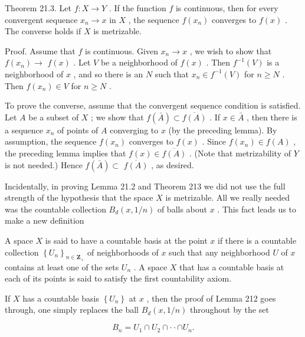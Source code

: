 Theorem 21.3. Let \(f : X \rightarrow  Y\) . If the function \(f\) is continuous, then for every convergent sequence \({x}_{n} \rightarrow  x\) in \(X\) , the sequence \(f\left( {x}_{n}\right)\) converges to \(f\left( x\right)\) . The converse holds if \(X\) is metrizable.

Proof. Assume that \(f\) is continuous. Given \({x}_{n} \rightarrow  x\) , we wish to show that \(f\left( {x}_{n}\right)  \rightarrow\)  \(f\left( x\right)\) . Let \(V\) be a neighborhood of \(f\left( x\right)\) . Then \({f}^{-1}\left( V\right)\) is a neighborhood of \(x\) , and so there is an \(N\) such that \({x}_{n} \in  {f}^{-1}\left( V\right)\) for \(n \geq  N\) . Then \(f\left( {x}_{n}\right)  \in  V\) for \(n \geq  N\) .

To prove the converse, assume that the convergent sequence condition is satisfied. Let \(A\) be a subset of \(X\) ; we show that \(f\left( \bar{A}\right)  \subset  \overline{f\left( A\right) }\) . If \(x \in  \bar{A}\) , then there is a sequence \({x}_{n}\) of points of \(A\) converging to \(x\) (by the preceding lemma). By assumption, the sequence \(f\left( {x}_{n}\right)\) converges to \(f\left( x\right)\) . Since \(f\left( {x}_{n}\right)  \in  f\left( A\right)\) , the preceding lemma implies that \(f\left( x\right)  \in  \overline{f\left( A\right) }\) . (Note that metrizability of \(Y\) is not needed.) Hence \(f\left( \bar{A}\right)  \subset\)  \(\overline{f\left( A\right) }\) , as desired.

Incidentally, in proving Lemma 21.2 and Theorem 213 we did not use the full strength of the hypothesis that the space \(X\) is metrizable. All we really needed was the countable collection \({B}_{d}\left( {x,1/n}\right)\) of balls about \(x\) . This fact leads us to make a new definition

A space \(X\) is said to have a countable basis at the point \(x\) if there is a countable collection \({\left\{  {U}_{n}\right\}  }_{n \in  {\mathbf{Z}}_{ + }}\) of neighborhoods of \(x\) such that any neighborhood \(U\) of \(x\) contains at least one of the sets \({U}_{n}\) . A space \(X\) that has a countable basis at each of its points is said to satisfy the first countability axiom.

If \(X\) has a countable basis \(\left\{  {U}_{n}\right\}\) at \(x\) , then the proof of Lemma 212 goes through, one simply replaces the ball \({B}_{d}\left( {x,1/n}\right)\) throughout by the set

\[
{B}_{n} = {U}_{1} \cap  {U}_{2} \cap   \cdot   \cdot   \cap  {U}_{n}.
\]

